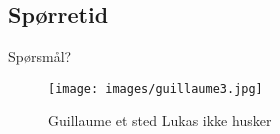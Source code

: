 \subsection*{Spørretid}
\begin{frame}{Spørsmål?}
    \begin{figure}
        \centering
        \texttt{[image: images/guillaume3.jpg]}
        \caption{Guillaume et sted Lukas ikke husker}
        \label{fig:guillaume3}
    \end{figure}
\end{frame}